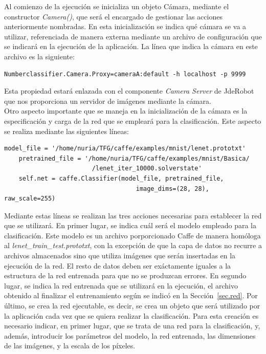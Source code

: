 Al comienzo de la ejecución se inicializa un objeto Cámara, mediante el constructor \textit{Camera()}, que será el encargado de gestionar las acciones anteriormente nombradas. En esta inicialización se indica qué cámara se va a utilizar, referenciada de manera externa mediante un archivo de configuración que se indicará en la ejecución de la aplicación. La línea que indica la cámara en este archivo es la siguiente:
\vspace{10pt}
\begin{lstlisting}[frame=single]
	Numberclassifier.Camera.Proxy=cameraA:default -h localhost -p 9999
\end{lstlisting}
Esta propiedad estará enlazada con el componente \textit{Camera Server} de JdeRobot que nos proporciona un servidor de imágenes mediante la cámara.\\

Otro aspecto importante que se maneja en la inicialización de la cámara es la especificación y carga de la red que se empleará para la clasificación. Este aspecto se realiza mediante las siguientes líneas:
\vspace{10pt}
\begin{lstlisting}[frame=single]
	model_file = '/home/nuria/TFG/caffe/examples/mnist/lenet.prototxt'
	pretrained_file = '/home/nuria/TFG/caffe/examples/mnist/Basica/
						/lenet_iter_10000.solverstate'
	self.net = caffe.Classifier(model_file, pretrained_file, 
									image_dims=(28, 28), raw_scale=255)
\end{lstlisting}
Mediante estas líneas se realizan las tres acciones necesarias para establecer la red que se utilizará. En primer lugar, se indica cuál será el modelo empleado para la clasificación. Este modelo es un archivo porporcionado Caffe de manera homóloga al \textit{lenet\_train\_test.prototxt}, con la excepción de que la capa de datos no recurre a archivos almacenados sino que utiliza imágenes que serán insertadas en la ejecución de la red. El resto de datos deben ser exáctamente iguales a la estructura de la red entrenada para que no se produzcan errores. En segundo lugar, se indica la red entrenada que se utilizará en la ejecución, el archivo obtenido al finalizar el entrenamiento según se indicó en la Sección~\ref{sec.red}. Por último, se crea la red ejecutable, es decir, se crea un objeto que será utilizado por la aplicación cada vez que se quiera realizar la clasificación. Para esta creación es necesario indicar, en primer lugar, que se trata de una red para la clasificación, y, además, introducir los parámetros del modelo, la red entrenada, las dimensiones de las imágenes, y la escala de los píxeles.\\

